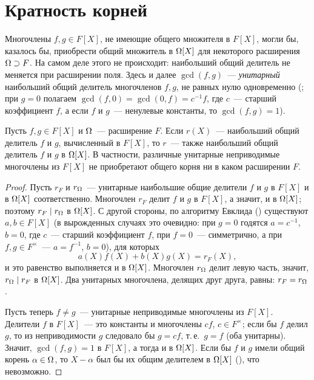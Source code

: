 \section{Кратность корней}

Многочлены $f,g\in F[X]$, не имеющие общего множителя в $F[X]$, могли бы, казалось бы, приобрести общий множитель в
$\Omega[X]$ для некоторого расширения $\Omega\supset F$. На самом деле этого не происходит: наибольший общий делитель не
меняется при расширении поля. Здесь и далее $\gcd(f,g)$~--- \emph{унитарный} наибольший общий делитель многочленов $f,g$,
не равных нулю одновременно (; при $g=0$ полагаем $\gcd(f,0)=\gcd(0,f)=c^{-1}f$, где $c$~--- старший
коэффициент $f$, а если $f$ и $g$~--- ненулевые константы, то $\gcd(f,g)=1$).

\begin{proposition}[2.17]
Пусть $f,g\in F[X]$ и $\Omega$~--- расширение $F$. Если $r(X)$~--- наибольший общий делитель $f$ и $g$, вычисленный в
$F[X]$, то $r$~--- также наибольший общий делитель $f$ и $g$ в $\Omega[X]$. В частности, различные унитарные неприводимые
многочлены из $F[X]$ не приобретают общего корня ни в каком расширении $F$.
\end{proposition}

\begin{proof}
Пусть $r_F$ и $r_\Omega$~--- унитарные наибольшие общие делители $f$ и $g$ в $F[X]$ и в $\Omega[X]$ соответственно.
Многочлен $r_F$ делит $f$ и $g$ в $F[X]$, а значит, и в $\Omega[X]$; поэтому $r_F\mid r_\Omega$ в $\Omega[X]$. С другой
стороны, по алгоритму Евклида () существуют $a,b\in F[X]$ (в вырожденных случаях это очевидно: при $g=0$ годятся
$a=c^{-1}$, $b=0$, где $c$~--- старший коэффициент $f$, при $f=0$~--- симметрично, а при $f,g\in F^\times$~--- $a=f^{-1}$,
$b=0$), для которых
\[
a(X)f(X)+b(X)g(X)=r_F(X),
\]
и это равенство выполняется и в $\Omega[X]$. Многочлен $r_\Omega$ делит левую часть, значит, $r_\Omega\mid r_F$ в $\Omega[X]$.
Два унитарных многочлена, делящих друг друга, равны: $r_F=r_\Omega$.

Пусть теперь $f\ne g$~--- унитарные неприводимые многочлены из $F[X]$. Делители $f$ в $F[X]$~--- это константы и
многочлены $cf$, $c\in F^\times$; если бы $f$ делил $g$, то из неприводимости $g$ следовало бы $g=cf$, т.\,е.\ $g=f$ (оба
унитарны). Значит, $\gcd(f,g)=1$ в $F[X]$, а тогда и в $\Omega[X]$. Если бы $f$ и $g$ имели общий корень $\alpha\in\Omega$, то
$X-\alpha$ был бы их общим делителем в $\Omega[X]$ (), что невозможно.
\end{proof}

